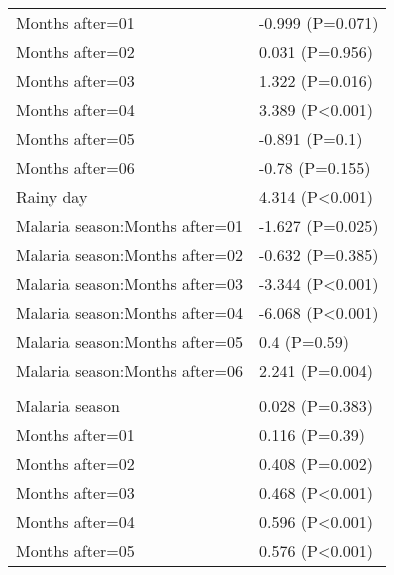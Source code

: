 \documentclass[]{article}
\begin{document}
\begin{longtable}[t]{ll}
\hspace{1em}Months after=01 & -0.999 (P=0.071)\\
\hspace{1em}Months after=02 & 0.031 (P=0.956)\\
\hspace{1em}Months after=03 & 1.322 (P=0.016)\\
\hspace{1em}Months after=04 & 3.389 (P<0.001)\\
\hspace{1em}Months after=05 & -0.891 (P=0.1)\\
\hspace{1em}Months after=06 & -0.78 (P=0.155)\\
\hspace{1em}Rainy day & 4.314 (P<0.001)\\
\hspace{1em}Malaria season:Months after=01 & -1.627 (P=0.025)\\
\hspace{1em}Malaria season:Months after=02 & -0.632 (P=0.385)\\
\hspace{1em}Malaria season:Months after=03 & -3.344 (P<0.001)\\
\hspace{1em}Malaria season:Months after=04 & -6.068 (P<0.001)\\
\hspace{1em}Malaria season:Months after=05 & 0.4 (P=0.59)\\
\hspace{1em}Malaria season:Months after=06 & 2.241 (P=0.004)\\
\addlinespace[1.5em]
\multicolumn{2}{l}{\textbf{Temporary field worker}}\\
\hspace{1em}Malaria season & 0.028 (P=0.383)\\
\hspace{1em}Months after=01 & 0.116 (P=0.39)\\
\hspace{1em}Months after=02 & 0.408 (P=0.002)\\
\hspace{1em}Months after=03 & 0.468 (P<0.001)\\
\hspace{1em}Months after=04 & 0.596 (P<0.001)\\
\hspace{1em}Months after=05 & 0.576 (P<0.001)\\

\end{longtable}
\end{document}
